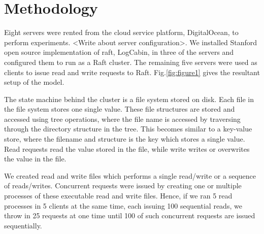 \section{Methodology}

Eight servers were rented from the cloud service platform, DigitalOcean, to perform experiments. <Write about server configuration>. We installed Stanford open source implementation of raft, LogCabin, in three of the servers and configured them to run as a Raft cluster. The remaining five servers were used as clients to issue read and write requests to Raft. Fig.\ref{fig:figure1} gives the resultant setup of the model.

The state machine behind the cluster is a file system stored on disk. Each file in the file system stores one single value. These file structures are stored and accessed using tree operations, where the file name is accessed by traversing through the directory structure in the tree. This becomes similar to a key-value store, where the filename and structure is the key which stores a single value. Read requests read the value stored in the file, while write writes or overwrites the value in the file. 

We created read and write files which performs a single read/write or a sequence of reads/writes. Concurrent requests were issued by creating one or multiple processes of these executable read and write files. Hence, if we ran 5 read processes in 5 clients at the same time, each issuing 100 sequential reads, we throw in 25 requests at one time until 100 of such concurrent requests are issued sequentially.



 

